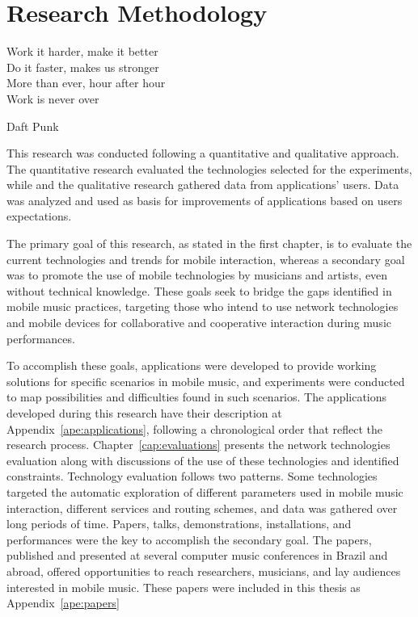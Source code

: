 \chapter{Research Methodology}
\label{cap:research}

 \epigraph{
 Work it harder, make it better\\
 Do it faster, makes us stronger\\
 More than ever, hour after hour\\
 Work is never over}
 {Daft Punk}

This research was conducted following a quantitative and qualitative approach.
The quantitative research evaluated the technologies selected for the experiments, while and the qualitative research gathered data from applications' users.
Data was analyzed and used as basis for improvements of applications based on users expectations.

The primary goal of this research, as stated in the first chapter, is to evaluate the current technologies and trends for mobile interaction, whereas 
a secondary goal was to promote the use of mobile technologies by musicians and artists, even without technical knowledge.
These goals seek to bridge the gaps identified in mobile music practices, targeting those who intend to use network technologies and mobile devices for collaborative and cooperative interaction during music performances.


To accomplish these goals, applications were developed to provide working solutions for specific scenarios in mobile music, and experiments were conducted to map possibilities and difficulties found in such scenarios.
The applications developed during this research have their description at Appendix~\ref{ape:applications}, following a chronological order that reflect the research process.
Chapter~\ref{cap:evaluations} presents the network technologies evaluation along with discussions of the use of these technologies and identified constraints.
Technology evaluation follows two patterns. 
Some technologies targeted the automatic exploration of different parameters used in mobile music interaction, different services and routing schemes, and data was gathered over long periods of time.
Papers, talks, demonstrations, installations, and performances were the key to accomplish the secondary goal.
The papers, published and presented at several computer music conferences in Brazil and abroad, offered opportunities to reach researchers, musicians, and lay audiences interested in mobile music.
These papers were included in this thesis as Appendix~\ref{ape:papers}

